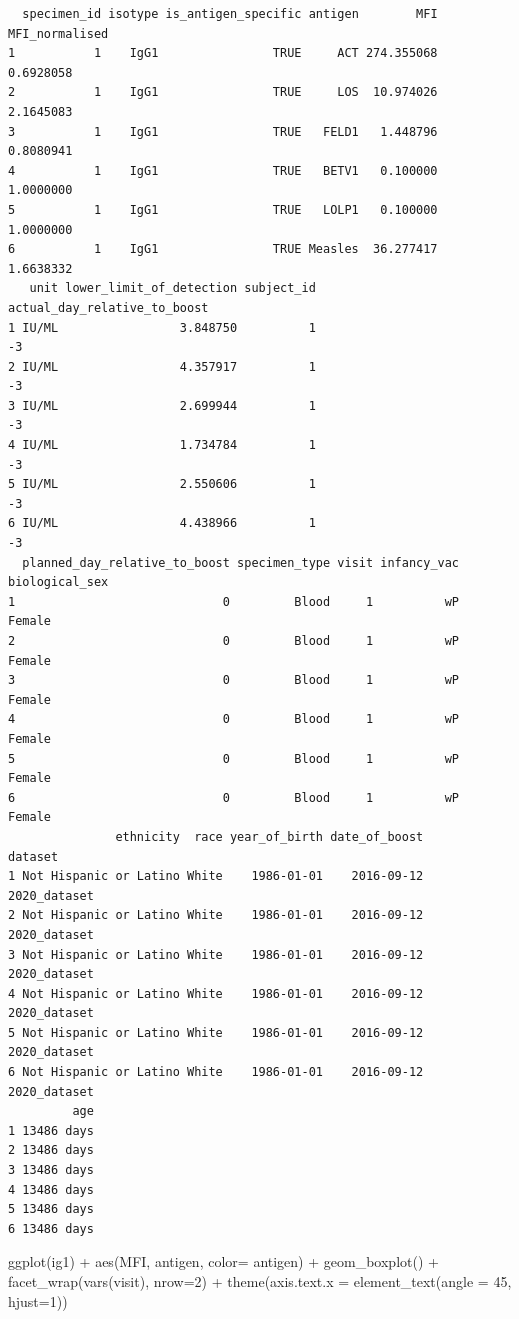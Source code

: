 \documentclass[
  letterpaper,
  DIV=11,
  numbers=noendperiod]{scrartcl}
\newenvironment{Shaded}{\begin{snugshade}}{\end{snugshade}}
\newcommand{\AttributeTok}[1]{\textcolor[rgb]{0.40,0.45,0.13}{#1}}
\newcommand{\DecValTok}[1]{\textcolor[rgb]{0.68,0.00,0.00}{#1}}
\newcommand{\FunctionTok}[1]{\textcolor[rgb]{0.28,0.35,0.67}{#1}}
\newcommand{\NormalTok}[1]{\textcolor[rgb]{0.00,0.23,0.31}{#1}}
\newcommand{\SpecialCharTok}[1]{\textcolor[rgb]{0.37,0.37,0.37}{#1}}
\begin{document}
\begin{verbatim}
  specimen_id isotype is_antigen_specific antigen        MFI MFI_normalised
1           1    IgG1                TRUE     ACT 274.355068      0.6928058
2           1    IgG1                TRUE     LOS  10.974026      2.1645083
3           1    IgG1                TRUE   FELD1   1.448796      0.8080941
4           1    IgG1                TRUE   BETV1   0.100000      1.0000000
5           1    IgG1                TRUE   LOLP1   0.100000      1.0000000
6           1    IgG1                TRUE Measles  36.277417      1.6638332
   unit lower_limit_of_detection subject_id actual_day_relative_to_boost
1 IU/ML                 3.848750          1                           -3
2 IU/ML                 4.357917          1                           -3
3 IU/ML                 2.699944          1                           -3
4 IU/ML                 1.734784          1                           -3
5 IU/ML                 2.550606          1                           -3
6 IU/ML                 4.438966          1                           -3
  planned_day_relative_to_boost specimen_type visit infancy_vac biological_sex
1                             0         Blood     1          wP         Female
2                             0         Blood     1          wP         Female
3                             0         Blood     1          wP         Female
4                             0         Blood     1          wP         Female
5                             0         Blood     1          wP         Female
6                             0         Blood     1          wP         Female
               ethnicity  race year_of_birth date_of_boost      dataset
1 Not Hispanic or Latino White    1986-01-01    2016-09-12 2020_dataset
2 Not Hispanic or Latino White    1986-01-01    2016-09-12 2020_dataset
3 Not Hispanic or Latino White    1986-01-01    2016-09-12 2020_dataset
4 Not Hispanic or Latino White    1986-01-01    2016-09-12 2020_dataset
5 Not Hispanic or Latino White    1986-01-01    2016-09-12 2020_dataset
6 Not Hispanic or Latino White    1986-01-01    2016-09-12 2020_dataset
         age
1 13486 days
2 13486 days
3 13486 days
4 13486 days
5 13486 days
6 13486 days
\end{verbatim}

\begin{Shaded}
\begin{Highlighting}[]
\FunctionTok{ggplot}\NormalTok{(ig1) }\SpecialCharTok{+}
  \FunctionTok{aes}\NormalTok{(MFI, antigen, }\AttributeTok{color=}\NormalTok{ antigen) }\SpecialCharTok{+}
  \FunctionTok{geom\_boxplot}\NormalTok{() }\SpecialCharTok{+}
  \FunctionTok{facet\_wrap}\NormalTok{(}\FunctionTok{vars}\NormalTok{(visit), }\AttributeTok{nrow=}\DecValTok{2}\NormalTok{) }\SpecialCharTok{+}
  \FunctionTok{theme}\NormalTok{(}\AttributeTok{axis.text.x =} \FunctionTok{element\_text}\NormalTok{(}\AttributeTok{angle =} \DecValTok{45}\NormalTok{, }\AttributeTok{hjust=}\DecValTok{1}\NormalTok{))}
\end{Highlighting}
\end{Shaded}
\end{document}
